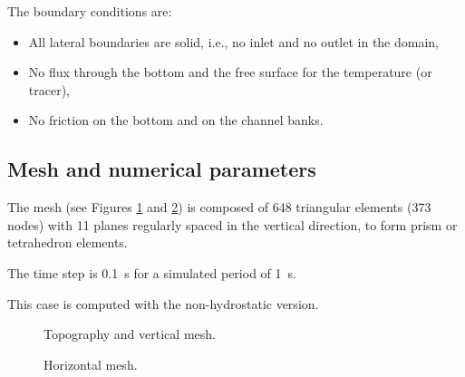 \bigskip
The boundary conditions are:
\begin{itemize}
\item All lateral boundaries are solid, i.e., no inlet and no outlet in the domain,
\item No flux through the bottom and the free surface for the temperature (or tracer),
\item No friction on the bottom and on the channel banks.
\end{itemize}

\subsection{Mesh and numerical parameters}
\bigskip
The mesh (see Figures \ref{t3d:V:fig:meshV} and \ref{t3d:V:fig:meshH}) 
is composed of 648 triangular elements (373 nodes) with 11 planes regularly 
spaced in the vertical direction, to form prism or tetrahedron elements.

\bigskip
The time step is 0.1~s for a simulated period of 1~s.

\bigskip
This case is computed with the non-hydrostatic version.

\begin{figure}[!htbp]
 \centering
 \caption{Topography and vertical mesh.}
 \label{t3d:V:fig:meshV}
\end{figure}
\begin{figure}[!htbp]
 \centering
 \caption{Horizontal mesh.}
 \label{t3d:V:fig:meshH}
\end{figure}

